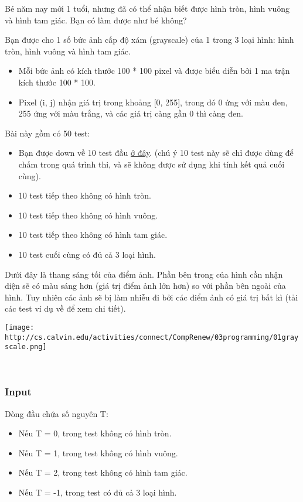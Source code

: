 



Bé năm nay mới 1 tuổi, nhưng đã có thể nhận biết được hình tròn, hình vuông và hình tam giác. Bạn có làm được như bé không?

Bạn được cho 1 số bức ảnh cấp độ xám (grayscale) của 1 trong 3 loại hình: hình tròn, hình vuông và hình tam giác.
\begin{itemize}
	\item Mỗi bức ảnh có kích thước 100 * 100 pixel và được biểu diễn bởi 1 ma trận kích thước 100 * 100.
	\item Pixel (i, j) nhận giá trị trong khoảng [0, 255], trong đó 0 ứng với màu đen, 255 ứng với màu trắng, và các giá trị càng gần 0 thì càng đen.
\end{itemize}

Bài này gồm có 50 test:
\begin{itemize}
	\item Bạn được down về 10 test đầu \href{https://www.dropbox.com/s/rmiayackco34itk/Archive.zip?dl=0}{ở đây}. (chú ý 10 test này sẽ chỉ được dùng để chấm trong quá trình thi, và sẽ không được sử dụng khi tính kết quả cuối cùng).
	\item 10 test tiếp theo không có hình tròn.
	\item 10 test tiếp theo không có hình vuông.
	\item 10 test tiếp theo không có hình tam giác.
	\item 10 test cuối cùng có đủ cả 3 loại hình.
\end{itemize}

Dưới đây là thang sáng tối của điểm ảnh. Phần bên trong của hình cần nhận diện sẽ có màu sáng hơn (giá trị điểm ảnh lớn hơn) so với phần bên ngoài của hình. Tuy nhiên các ảnh sẽ bị làm nhiễu đi bởi các điểm ảnh có giá trị bất kì (tải các test ví dụ về để xem chi tiết).


\texttt{[image: http://cs.calvin.edu/activities/connect/CompRenew/03programming/01grayscale.png]}

 

\subsubsection{Input}

Dòng đầu chứa số nguyên T:
\begin{itemize}
	\item Nếu T = 0, trong test không có hình tròn.
	\item Nếu T = 1, trong test không có hình vuông.
	\item Nếu T = 2, trong test không có hình tam giác.
	\item Nếu T = -1, trong test có đủ cả 3 loại hình.
\end{itemize}

